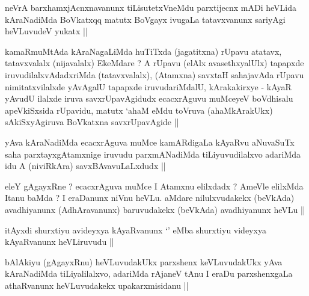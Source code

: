 
\begin{artha}
neVrA barxhamxjAcnxnavanunx tiLisutetxVneMdu parxtijecnx mADi heVLida kAraNadiMda BoVkatxqq matutx BoVgayx ivugaLa tatavxvanunx sariyAgi heVLuvudeV yukatx ||
\end{artha}


\begin{artha}
kamaRmuMtAda kAraNagaLiMda huTiTxda (jagatitxna) rUpavu atatavx, tatavxvalalx (nijavalalx) EkeMdare ? A rUpavu (elAlx avasethxyalUlx) tapapxde iruvudilalxvAdadxriMda (tatavxvalalx), (Atamxna) savxtaH sahajavAda rUpavu nimitatxvilalxde yAvAgalU tapapxde iruvudariMdalU, kArakakirxye - kAyaR yAvudU ilalxde iruva savxrUpavAgidudx ecacxrAguvu muMceyeV boVdhisalu apeVkiSxsida rUpavidu, matutx `ahaM eMdu toVruva (ahaMkArakUkx) sAkiSxyAgiruva BoVkatxna savxrUpavAgide ||
\end{artha}

\begin{artha}
yAva kAraNadiMda ecacxrAguva muMce kamARdigaLa kAyaRvu aNuvaSuTx saha parxtayxgAtamxnige iruvudu parxmANadiMda tiLiyuvudilalxvo adariMda idu A (niviRkAra) savxBAvavuLaLxdudx ||
\end{artha}


\begin{artha}
eleY gAgayxRne ? ecacxrAguva muMce I Atamxnu elilxdadx ? AmeVle elilxMda Itanu baMda ? I eraDanunx niVnu heVLu. aMdare nilulxvudakekx (beVkAda) avadhiyanunx (AdhAravanunx) baruvudakekx (beVkAda) avadhiyanunx heVLu ||
\end{artha}


\begin{artha}
itAyxdi shurxtiyu avideyxya kAyaRvanunx `\stext' eMba shurxtiyu videyxya kAyaRvanunx heVLiruvudu ||
\end{artha}

\begin{artha}
bAlAkiyu (gAgayxRnu) heVLuvudakUkx parxshenx keVLuvudakUkx yAva kAraNadiMda tiLiyalilalxvo, adariMda rAjaneV tAnu I eraDu parxshenxgaLa athaRvanunx heVLuvudakekx upakarxmisidanu ||
\end{artha}

